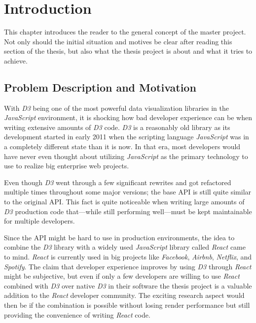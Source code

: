 \chapter{Introduction}
\label{cha:Introduction}

This chapter introduces the reader to the general concept of the master project. Not only should the initial situation and motives be clear after reading this section of the thesis, but also what the thesis project is about and what it tries to achieve.

\section{Problem Description and Motivation}

With \emph{D3} being one of the most powerful data visualization libraries in the \emph{JavaScript} environment, it is shocking how bad developer experience can be when writing extensive amounts of \emph{D3} code. \emph{D3} is a reasonably old library as its development started in early 2011 when the scripting language \emph{JavaScript} was in a completely different state than it is now. In that era, most developers would have never even thought about utilizing \emph{JavaScript} as the primary technology to use to realize big enterprise web projects. 

Even though \emph{D3} went through a few sig\-nifi\-cant rewrites and got refactored multiple times throughout some major versions; the base API is still quite similar to the original API. This fact is quite noticeable when writing large amounts of \emph{D3} production code that---while still performing well---must be kept maintainable for multiple developers.

Since the API might be hard to use in production environments, the idea to combine the \emph{D3} library with a widely used \emph{JavaScript} library called \emph{React} came to mind. \emph{React} is currently used in big projects like \emph{Facebook}, \emph{Airbnb}, \emph{Netflix}, and \emph{Spotify}. The claim that developer experience improves by using \emph{D3} through \emph{React} might be subjective, but even if only a few developers are willing to use \emph{React} combined with \emph{D3} over native \emph{D3} in their software the thesis project is a valuable addition to the \emph{React} developer community. The exciting research aspect would then be if the combination is possible without losing render performance but still providing the convenience of writing \emph{React} code.

